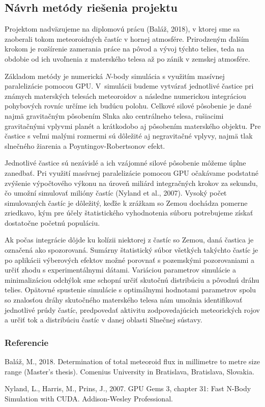 \subsection{Návrh metódy riešenia
projektu}\label{nuxe1vrh-metuxf3dy-rieux161enia-projektu}

Projektom nadväzujeme na diplomovú prácu (Baláž, 2018), v ktorej sme sa
zaoberali tokom meteoroidných častíc v hornej atmosfére. Prirodzeným
ďalším krokom je rozšírenie zamerania práce na pôvod a vývoj týchto
telies, teda na obdobie od ich uvoľnenia z materského telesa až po zánik
v zemskej atmosfére.

Základom metódy je numerická \(N\)-body simulácia s využitím masívnej
paralelizácie pomocou GPU. V~simulácii budeme vytvárať jednotlivé
častice pri známych materských telesách meteoroidov a následne
numerickou integráciou pohybových rovníc určíme ich budúcu polohu.
Celkové silové pôsobenie je dané najmä gravitačným pôsobením Slnka ako
centrálneho telesa, rušiacimi gravitačnými vplyvmi planét a krátkodobo
aj pôsobením materského objektu. Pre častice s veľmi malými rozmermi sú
dôležité aj negravitačné vplyvy, najmä tlak slnečného žiarenia a
Poyntingov-Robertsonov efekt.

Jednotlivé častice sú nezávislé a ich vzájomné silové pôsobenie môžeme
úplne zanedbať. Pri využití masívnej paralelizácie pomocou GPU očakávame
podstatné zvýšenie výpočtového výkonu na úroveň miliárd integračných
krokov za sekundu, čo umožní simulovať milióny častíc (Nyland et al.,
2007). Vysoký počet simulovaných častíc je dôležitý, keďže k zrážkam so
Zemou dochádza pomerne zriedkavo, kým pre účely štatistického
vyhodnotenia súboru potrebujeme získať dostatočne početnú populáciu.

Ak počas integrácie dôjde ku kolízii niektorej z častíc so Zemou, daná
častica je označená ako spozorovaná. Sumárny štatistický súbor všetkých
takýchto častíc je po aplikácii výberových efektov možné porovnať s
pozemskými pozorovaniami a určiť zhodu s experimentálnymi dátami.
Variáciou parametrov simulácie a minimalizáciou odchýlok sme schopní
určiť skutočnú distribúciu a pôvodnú dráhu telies. Opätovné spustenie
simulácie s optimálnymi hodnotami parametrov spolu so znalosťou dráhy
skutočného materského telesa nám umožnia identifikovať jednotlivé prúdy
častíc, predpovedať aktivitu zodpovedajúcich meteorických rojov a určiť
tok a distribúciu častíc v danej oblasti Slnečnej sústavy.

\subsubsection*{Referencie}\label{referencie}

\hypertarget{refs}{}
\hypertarget{ref-balaz2018}{}
Baláž, M., 2018. Determination of total meteoroid flux in millimetre to
metre size range (Master's thesis). Comenius University in Bratislava,
Bratislava, Slovakia.

\hypertarget{ref-nyland2007}{}
Nyland, L., Harris, M., Prins, J., 2007. GPU Gems 3, chapter 31: Fast
N-Body Simulation with CUDA. Addison-Wesley Professional.
